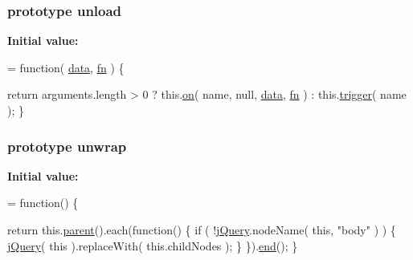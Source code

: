 \hypertarget{jquery-1_810_82-vsdoc_8js_ae048eb914220ef1a45b8cef8fbf97041}{
\subsubsection[{unload}]{ {\bf prototype} unload}}\label{jquery-1_810_82-vsdoc_8js_ae048eb914220ef1a45b8cef8fbf97041}
{\bfseries Initial value\-:}
\begin{DoxyCode}
= \textcolor{keyword}{function}( \hyperlink{jquery-1_810_82-vsdoc_8js_a609407b3456fdc3c5671a9fc4a226ff7}{data}, \hyperlink{jquery-1_810_82-vsdoc_8js_acef6bdaf6b9b20fdcca1ea86f0902c3b}{fn} ) \{


        \textcolor{keywordflow}{return} arguments.length > 0 ?
            this.\hyperlink{jquery-1_810_82-vsdoc_8js_ae453b412b883f60220d73468ef6c6dbc}{on}( name, null, \hyperlink{jquery-1_810_82-vsdoc_8js_a609407b3456fdc3c5671a9fc4a226ff7}{data}, \hyperlink{jquery-1_810_82-vsdoc_8js_acef6bdaf6b9b20fdcca1ea86f0902c3b}{fn} ) :
            this.\hyperlink{jquery-1_810_82-vsdoc_8js_a2388c4114d5e3e4eab020f973641519c}{trigger}( name );
    \}
\end{DoxyCode}
\hypertarget{jquery-1_810_82-vsdoc_8js_a3916788ca00ed5d623ae18b843eb1bda}{
\subsubsection[{unwrap}]{ {\bf prototype} unwrap}}\label{jquery-1_810_82-vsdoc_8js_a3916788ca00ed5d623ae18b843eb1bda}
{\bfseries Initial value\-:}
\begin{DoxyCode}
= \textcolor{keyword}{function}() \{


        \textcolor{keywordflow}{return} this.\hyperlink{jquery-1_810_82-vsdoc_8js_aed9b5e7a755bcccb282f9b06c00a6822}{parent}().each(\textcolor{keyword}{function}() \{
            \textcolor{keywordflow}{if} ( !\hyperlink{jquery-1_810_82-vsdoc_8js_add5237586d970a38a81f990e8eb28c6c}{jQuery}.nodeName( \textcolor{keyword}{this}, \textcolor{stringliteral}{"body"} ) ) \{
                \hyperlink{jquery-1_810_82-vsdoc_8js_add5237586d970a38a81f990e8eb28c6c}{jQuery}( \textcolor{keyword}{this} ).replaceWith( this.childNodes );
            \}
        \}).\hyperlink{jquery-1_810_82-vsdoc_8js_af2ce7c86b4e6e9d61f85745258f4ef32}{end}();
    \}
\end{DoxyCode}
